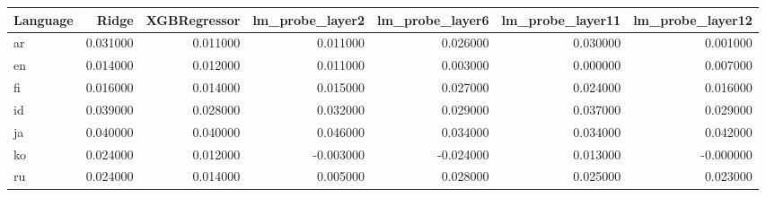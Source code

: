 \begin{tabular}{lrrrrrr}
\toprule
Language & Ridge & XGBRegressor & lm_probe_layer2 & lm_probe_layer6 & lm_probe_layer11 & lm_probe_layer12 \\
\midrule
ar & 0.031000 & 0.011000 & 0.011000 & 0.026000 & 0.030000 & 0.001000 \\
en & 0.014000 & 0.012000 & 0.011000 & 0.003000 & 0.000000 & 0.007000 \\
fi & 0.016000 & 0.014000 & 0.015000 & 0.027000 & 0.024000 & 0.016000 \\
id & 0.039000 & 0.028000 & 0.032000 & 0.029000 & 0.037000 & 0.029000 \\
ja & 0.040000 & 0.040000 & 0.046000 & 0.034000 & 0.034000 & 0.042000 \\
ko & 0.024000 & 0.012000 & -0.003000 & -0.024000 & 0.013000 & -0.000000 \\
ru & 0.024000 & 0.014000 & 0.005000 & 0.028000 & 0.025000 & 0.023000 \\
\bottomrule
\end{tabular}
